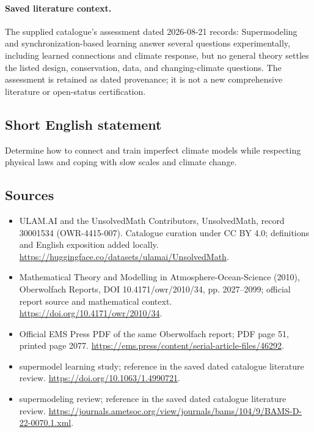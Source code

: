 \documentclass[11pt]{article}
\begin{document}
\paragraph{Saved literature context.} The supplied catalogue's assessment dated 2026-08-21 records: Supermodeling and synchronization-based learning answer several questions experimentally, including learned connections and climate response, but no general theory settles the listed design, conservation, data, and changing-climate questions. The assessment is retained as dated provenance; it is not a new comprehensive literature or open-status certification.
\subsection{Short English statement}
Determine how to connect and train imperfect climate models while respecting physical laws and coping with slow scales and climate change.
\subsection{Sources}
\begin{itemize}
\item[\hypertarget{source:30001534:1}{S1}] ULAM.AI and the UnsolvedMath Contributors, UnsolvedMath, record 30001534 (OWR-4415-007). Catalogue curation under CC BY 4.0; definitions and English exposition added locally.
\url{https://huggingface.co/datasets/ulamai/UnsolvedMath}.
\item[\hypertarget{source:30001534:2}{S2}] Mathematical Theory and Modelling in Atmosphere-Ocean-Science (2010), Oberwolfach Reports, DOI 10.4171/owr/2010/34, pp. 2027--2099; official report source and mathematical context.
\url{https://doi.org/10.4171/owr/2010/34}.
\item[\hypertarget{source:30001534:3}{S3}] Official EMS Press PDF of the same Oberwolfach report; PDF page 51, printed page 2077.
\url{https://ems.press/content/serial-article-files/46292}.
\item[\hypertarget{source:30001534:4}{S4}] supermodel learning study; reference in the saved dated catalogue literature review.
\url{https://doi.org/10.1063/1.4990721}.
\item[\hypertarget{source:30001534:5}{S5}] supermodeling review; reference in the saved dated catalogue literature review.
\url{https://journals.ametsoc.org/view/journals/bams/104/9/BAMS-D-22-0070.1.xml}.
\end{itemize}
\label{end:30001534}
\end{document}
